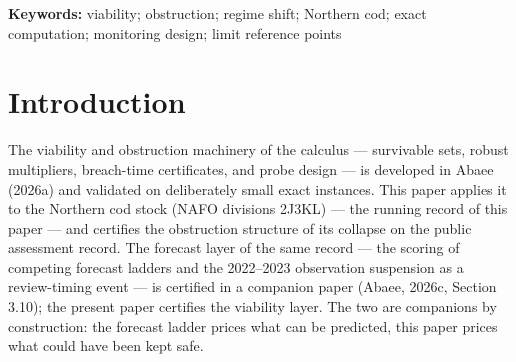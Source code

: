 \documentclass[10pt,twocolumn]{article}
\theoremstyle{plain}
\theoremstyle{remark}
\begin{document}
\begin{abstract}
collapse-era steps 1991--1995 certify as declines and the 1993 floor
breach holds at the band's upper edge (\(115 < 276\)), while no
reference-decade step certifies; the reference decade's window profile
shows every subwindow of horizon four or more growing (the sustained-decline
reading holds only at horizons one to three); and the vintage's own
1954--1982 record has the window opening at \(28.3\%\) of the 1962 peak,
three years after a prior floor episode (1977--1979). The collapse is present in the raw survey index (a certified
factor of \(\tfrac{21797}{2127417}\) over 1989--1994, falling \(2.6\)
times further than the assessment series over their common window);
the forage-fish covariate collapses in the same annual step in which
the mortality diagnostic crosses \(M=1\), two steps before the floor
breach; and both assessment vintages re-cross the floor at the 2015
reading, with outcome years at most
\(\tfrac{44000}{88460} \approx 49.7\%\) of the reference point. Every
quantity is regenerated by an accompanying verification script in
exact rational arithmetic.
\end{abstract}

\textbf{Keywords:} viability; obstruction; regime shift; Northern cod;
exact computation; monitoring design; limit reference points

\section{Introduction}\label{intro}

The viability and obstruction machinery of the calculus --- survivable
sets, robust multipliers, breach-time certificates, and probe design ---
is developed in Abaee (2026a) and validated on deliberately small exact
instances. This paper applies it to the Northern cod stock (NAFO
divisions 2J3KL) --- the running record of this paper --- and certifies
the obstruction structure of its collapse on the public assessment
record. The forecast layer of the
same record --- the scoring of competing forecast ladders and the
2022--2023 observation suspension as a review-timing event --- is
certified in a companion paper (Abaee, 2026c, Section 3.10); the
present paper certifies the viability layer. The two are companions by
construction: the forecast ladder prices what can be predicted, this
paper prices what could have been kept safe.
\end{document}
